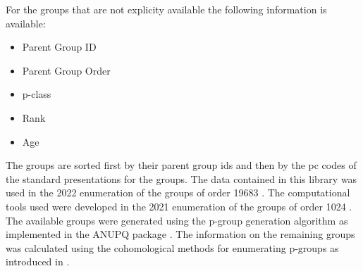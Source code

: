 \documentclass[a4paper,11pt]{report}
\begin{document}
{{ For the groups that are not explicity available the following information is
available: 

 
\begin{itemize}
\item  Parent Group ID 
\item  Parent Group Order 
\item  p-class 
\item  Rank 
\item  Age 
\end{itemize}
 

 The groups are sorted first by their parent group ids and then by the pc codes
of the standard presentations for the groups. The data contained in this
library was used in the 2022 enumeration of the groups of order 19683 \cite{Burrell2022a}. The computational tools used were developed in the 2021 enumeration of the
groups of order 1024 \cite{Burrell2021a}. The available groups were generated using the p-group generation algorithm \cite{OBrien1990a} as implemented in the ANUPQ package \cite{Gamble2019a}. The information on the remaining groups was calculated using the
cohomological methods for enumerating p-groups as introduced in \cite{Eick1999a}. 

 }

 }

   
\end{document}
